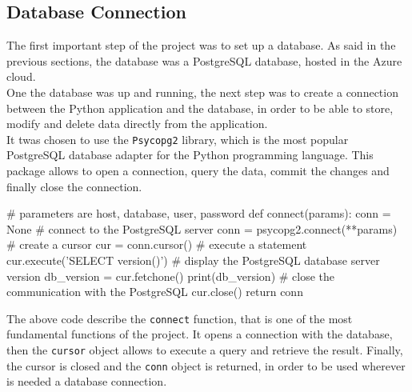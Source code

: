 \documentclass[12pt, a4paper, oneside]{article}
\begin{document}
\subsection{Database Connection}
The first important step of the project was to set up a database. As said in the previous sections, the database was a PostgreSQL database, hosted in the Azure cloud.\\
One the database was up and running, the next step was to create a connection between the Python application and the database, in order to be able to store, modify and delete data directly from the application.\\
It twas chosen to use the \texttt{Psycopg2} library, which is the most popular PostgreSQL database adapter for the Python programming language. This package allows to open a connection, query the data, 
commit the changes and finally close the connection.
\begin{python}
    # parameters are host, database, user, password
    def connect(params):
        conn = None
        # connect to the PostgreSQL server
        conn = psycopg2.connect(**params)
        # create a cursor
        cur = conn.cursor()
        # execute a statement
        cur.execute('SELECT version()')
        # display the PostgreSQL database server version
        db_version = cur.fetchone()
        print(db_version)
        # close the communication with the PostgreSQL
        cur.close()
        return conn
\end{python}
The above code describe the \texttt{connect} function, that is one of the most fundamental functions of the project. It opens a connection with the database, then the \texttt{cursor} object allows to execute a query
and retrieve the result. Finally, the cursor is closed and the \texttt{conn} object is returned, in order to be used wherever is needed a database connection.
\end{document}
